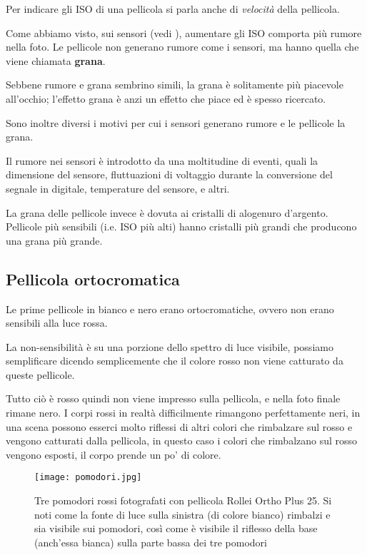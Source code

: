 Per indicare gli ISO di una pellicola si parla anche di \textit{velocità} della pellicola.

Come abbiamo visto, sui sensori (vedi ), aumentare gli ISO comporta più rumore nella foto.
Le pellicole non generano rumore come i sensori, ma hanno quella che viene chiamata \textbf{grana}.

Sebbene rumore e grana sembrino simili, la grana è solitamente più piacevole all'occhio; l'effetto grana è anzi un effetto che piace ed è spesso ricercato.

Sono inoltre diversi i motivi per cui i sensori generano rumore e le pellicole la grana.

Il rumore nei sensori è introdotto da una moltitudine di eventi, quali la dimensione del sensore, fluttuazioni di voltaggio durante la conversione del segnale in digitale, temperature del sensore, e altri.

La grana delle pellicole invece è dovuta ai cristalli di alogenuro d'argento. Pellicole più sensibili (i.e. ISO più alti) hanno cristalli più grandi che producono una grana più grande.


\subsection{Pellicola ortocromatica} \label{subsec:pellicolaorto}
Le prime pellicole in bianco e nero erano ortocromatiche, ovvero non erano sensibili alla luce rossa.

La non-sensibilità è su una porzione dello spettro di luce visibile, possiamo semplificare dicendo semplicemente che il colore rosso non viene catturato da queste pellicole.

Tutto ciò è rosso quindi non viene impresso sulla pellicola, e nella foto finale rimane nero.
I corpi rossi in realtà difficilmente rimangono perfettamente neri, in una scena possono esserci molto riflessi di altri colori che rimbalzare sul rosso e vengono catturati dalla pellicola, in questo caso i colori che rimbalzano sul rosso vengono esposti, il corpo prende un po' di colore.

\begin{figure}[H]
    \centering
    \texttt{[image: pomodori.jpg]}
    \caption{
        Tre pomodori rossi fotografati con pellicola Rollei Ortho Plus 25. Si noti come la fonte di luce sulla sinistra (di colore bianco) rimbalzi e sia visibile sui pomodori, così come è visibile il riflesso della base (anch'essa bianca) sulla parte bassa dei tre pomodori
    }
\end{figure}

